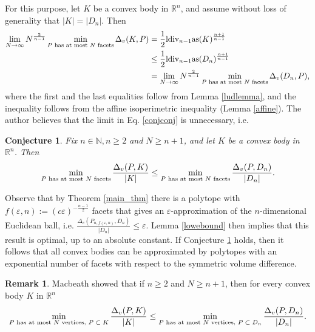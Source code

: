 \documentclass[10pt, twoside, leqno]{article}
\newtheorem{conj}[thm]{Conjecture}
\theoremstyle{definition}
\newtheorem{remark}[thm]{Remark}
\numberwithin{equation}{section}
\newcommand{\R}{\mathbb{R}}
\newcommand{\NNN}{N^{\frac 2{n-1} }}
\begin{document}
For this purpose, let $ K $ be a convex body in $ \R^{n}$, and assume without loss of generality that $ |K| = |D_n|$. Then%
\begin{equation}{\label{conjconj}}
\begin{aligned}\lim_{N\to\infty}\NNN\min_{P\text{ has at most \ensuremath{N} facets}}\Delta_{v}(K,P) & =\frac{1}{2}\textrm{ldiv}_{n-1}\text{as}(K)^{\frac{n+1}{n-1}}\\
& \leq\frac{1}{2}\textrm{ldiv}_{n-1}\text{as}(D_{n})^{\frac{n+1}{n-1}}\\
& =\lim_{N\to\infty}\NNN\min_{P\text{ has at most \ensuremath{N} facets}}\Delta_{v}(D_n,P),
\end{aligned}
\end{equation}
where the first and the last equalities follow from Lemma \ref{ludlemma}, and the  inequality follows from the affine isoperimetric inequality (Lemma \ref{affine}). The author believes that the limit in Eq. \eqref{conjconj} is unnecessary, i.e. 
\begin{conj}\label{macbeath1}
Fix $n\in\mathbb{N}, n\geq 2$ and $N\geq n+1$, and let $K$ be a convex body in $\R^n$. Then
	\[
	\min_{P \text{ has at most $ N $ facets}}\frac{\Delta_v(P,K)}{|K|} \leq \min_{P \text{ has at most $ N $ facets}}\frac{\Delta_v(P,D_n)}{|D_n|}.
	\]
\end{conj}
Observe that by Theorem \ref{main_thm} there is a polytope with  $ f(\varepsilon,n):=(c\varepsilon)^{-\frac{n-1}{2}}$ facets that gives an $\varepsilon$-approximation of the $ n $-dimensional Euclidean ball, i.e. $ \frac{\Delta_v(P_{n,f(\varepsilon,n)}, D_n)}{|D_n|} \leq \varepsilon.$  Lemma \ref{lowebound} then implies that this result is optimal, up to an absolute constant. If Conjecture \ref{macbeath1} holds, then it follows that all convex bodies can be approximated by polytopes with an exponential number of facets with respect to the symmetric volume difference. 
\begin{remark}
	Macbeath \cite{macbeath1951extremal} showed that if $n\geq 2$ and  $N\geq n+1$, then for  every convex body $ K $ in $ \R^n $  %
	\[
		\min_{P \text{ has at most $ N $ vertices, $ P \subset K $}}\frac{\Delta_v(P,K)}{|K|} \leq \min_{P \text{ has at most $ N $ vertices, $ P \subset D_n $}}\frac{\Delta_v(P, D_n)}{|D_n|}.
	\]
\end{remark}
\end{document}
